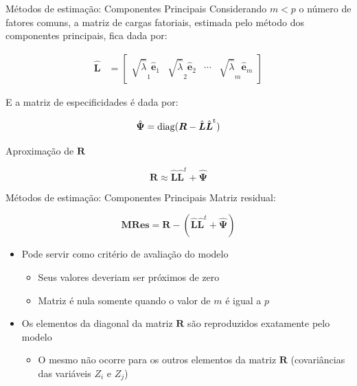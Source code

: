 \documentclass[
  ignorenonframetext,
  aspectratio=169,
]{beamer}
\providecommand{\tightlist}{%
  \setlength{\itemsep}{0pt}\setlength{\parskip}{0pt}}
\begin{document}
\begin{frame}{Métodos de estimação: Componentes Principais}
\label{muxe9todos-de-estimauxe7uxe3o-componentes-principais}
Considerando \(m < p\) o número de fatores comuns, a matriz de cargas
fatoriais, estimada pelo método dos componentes principais, fica dada
por:

\vspace{-0.3cm}

\[
\begin{aligned}
\hat{\boldsymbol{L}} &= \left[\begin{array}{cccc} \sqrt{\hat{\lambda}}_1 \hat{\boldsymbol{e}}_1 & \sqrt{\hat{\lambda}}_2 \hat{\boldsymbol{e}}_2 & \cdots & \sqrt{\hat{\lambda}}_m \hat{\boldsymbol{e}}_m \end{array}\right] 
\end{aligned}
\]

\pause

E a matriz de especificidades é dada por:

\[\hat{\boldsymbol{\Psi}} = \rm{diag}(\boldsymbol{R} - \hat{\boldsymbol{L}} \hat{\boldsymbol{L}}^t)\]

\pause

Aproximação de \(\boldsymbol{R}\)

\[\boldsymbol{R} \approx  \hat{\boldsymbol{L}} \hat{\boldsymbol{L}}^t +  \hat{\boldsymbol{\Psi}}\]
\end{frame}

\begin{frame}{Métodos de estimação: Componentes Principais}
\label{muxe9todos-de-estimauxe7uxe3o-componentes-principais-1}
Matriz residual:

\[\boldsymbol{MRes} = \boldsymbol{R} - (\hat{\boldsymbol{L}} \hat{\boldsymbol{L}}^t + \hat{\boldsymbol{\Psi}})\]

\pause

\begin{itemize}
\tightlist
\item
  Pode servir como critério de avaliação do modelo

  \begin{itemize}
  \tightlist
  \item
    Seus valores deveriam ser próximos de zero
  \item
    Matriz é nula somente quando o valor de \(m\) é igual a \(p\)
  \end{itemize}
\end{itemize}

\pause

\begin{itemize}
\tightlist
\item
  Os elementos da diagonal da matriz \(\boldsymbol{R}\) são reproduzidos
  exatamente pelo modelo

  \begin{itemize}
  \tightlist
  \item
    O mesmo não ocorre para os outros elementos da matriz
    \(\boldsymbol{R}\) (covariâncias das variáveis \(Z_i\) e \(Z_j\))
  \end{itemize}
\end{itemize}
\end{frame}
\end{document}
